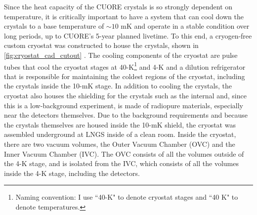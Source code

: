 Since the heat capacity of the CUORE crystals is so strongly dependent on temperature, it is critically important to have a system that can cool down the crystals to a base temperature of $\sim10$ mK and operate in a stable condition over long periods, up to CUORE's 5-year planned livetime.
To this end, a cryogen-free custom cryostat was constructed to house the crystals, shown in \autoref{fig:cryostat_cad_cutout} \cite{cryostat_commissioning}.
The cooling components of the cryostat are pulse tubes that cool the cryostat stages at 40-K\footnote{Naming convention: I use ``40-K" to denote cryostat stages and ``40 K" to denote temperatures.} and 4-K and a dilution refrigerator that is responsible for maintaining the coldest regions of the cryostat, including the crystals inside the 10-mK stage.
In addition to cooling the crystals, the cryostat also houses the shielding for the crystals such as the internal and, since this is a low-background experiment, is made of radiopure materials, especially near the detectors themselves.
Due to the background requirements and because the crystals themselves are housed inside the 10-mK shield, the cryostat was assembled underground at LNGS inside of a clean room.
Inside the cryostat, there are two vacuum volumes, the Outer Vacuum Chamber (OVC) and the Inner Vacuum Chamber (IVC).
The OVC consists of all the volumes outside of the 4-K stage, and is isolated from the IVC, which consists of all the volumes inside the 4-K stage, including the detectors.

